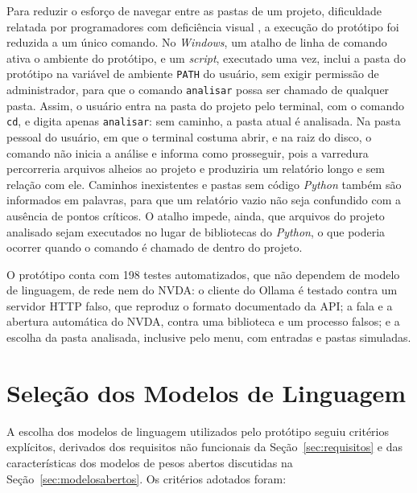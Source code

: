 \documentclass[
    12pt,                   %
    openright,              %
    oneside,                %
    a4paper,                %
    sumario=tradicional,    %
    english,                %
    brazil,                 %
    ]{abntex2}
\begin{document}
Para reduzir o esforço de navegar entre as pastas de um projeto, dificuldade relatada por programadores com deficiência visual \cite{latinoware20457}, a execução do protótipo foi reduzida a um único comando. No \textit{Windows}, um atalho de linha de comando ativa o ambiente do protótipo, e um \textit{script}, executado uma vez, inclui a pasta do protótipo na variável de ambiente \texttt{PATH} do usuário, sem exigir permissão de administrador, para que o comando \texttt{analisar} possa ser chamado de qualquer pasta. Assim, o usuário entra na pasta do projeto pelo terminal, com o comando \texttt{cd}, e digita apenas \texttt{analisar}: sem caminho, a pasta atual é analisada. Na pasta pessoal do usuário, em que o terminal costuma abrir, e na raiz do disco, o comando não inicia a análise e informa como prosseguir, pois a varredura percorreria arquivos alheios ao projeto e produziria um relatório longo e sem relação com ele. Caminhos inexistentes e pastas sem código \textit{Python} também são informados em palavras, para que um relatório vazio não seja confundido com a ausência de pontos críticos. O atalho impede, ainda, que arquivos do projeto analisado sejam executados no lugar de bibliotecas do \textit{Python}, o que poderia ocorrer quando o comando é chamado de dentro do projeto.

O protótipo conta com 198 testes automatizados, que não dependem de modelo de linguagem, de rede nem do NVDA: o cliente do Ollama é testado contra um servidor HTTP falso, que reproduz o formato documentado da API; a fala e a abertura automática do NVDA, contra uma biblioteca e um processo falsos; e a escolha da pasta analisada, inclusive pelo menu, com entradas e pastas simuladas.

\section{Seleção dos Modelos de Linguagem}\label{sec:modelos}

A escolha dos modelos de linguagem utilizados pelo protótipo seguiu critérios explícitos, derivados dos requisitos não funcionais da Seção~\ref{sec:requisitos} e das características dos modelos de pesos abertos discutidas na Seção~\ref{sec:modelosabertos}. Os critérios adotados foram:
\end{document}
